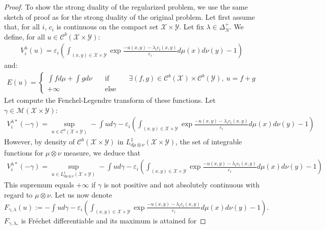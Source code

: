 \begin{proof}
To show the strong duality of the regularized problem, we use the same sketch of proof as for the strong duality of the original problem. 
\medskip
Let first assume that, for all $i$, $c_i$ is continuous on the compact set $\mathcal{X}\times\mathcal{Y}$. Let fix $\lambda\in\Delta^+_N$. We define, for all $u\in\mathcal{C}^b(\mathcal{X}\times\mathcal{Y})$:
\begin{align*}
    V^\lambda_i(u) = \varepsilon_i\left(\int_{(x,y)\in\mathcal{X}\times\mathcal{Y}} \exp{\frac{-u(x,y)-\lambda_ic_i(x,y)}{\varepsilon_i}}d\mu(x)d\nu(y)-1\right)
\end{align*}
and:
\begin{align*}
E(u)=\left\{\begin{matrix} \int fd\mu+\int gd\nu &\quad\text{if}\quad& \exists (f,g)\in \mathcal{C}^b(\mathcal{X})\times\mathcal{C}^b(\mathcal{Y}),~ u = f+g\\
+\infty &\quad\text{else}\quad&\end{matrix}\right.
\end{align*}
Let compute the Fenchel-Legendre transform of these functions. Let $\gamma\in\mathcal{M}(\mathcal{X}\times\mathcal{Y})$:
\begin{align*}
    V^{\lambda*}_i(-\gamma) = \sup_{u\in\mathcal{C}^b(\mathcal{X}\times\mathcal{Y})}-\int ud\gamma -\varepsilon_i\left(\int_{(x,y)\in\mathcal{X}\times\mathcal{Y}} \exp{\frac{-u(x,y)-\lambda_ic_i(x,y)}{\varepsilon_i}}d\mu(x)d\nu(y)-1\right) 
\end{align*}
However, by density of $\mathcal{C}^b(\mathcal{X}\times\mathcal{Y})$ in $L^1_{d\mu\otimes\nu}(\mathcal{X}\times\mathcal{Y})$, the set of integrable functions for $\mu\otimes\nu$ measure, we deduce that
\begin{align*}
    V^{\lambda*}_i(-\gamma) = \sup_{u\in L^1_{d\mu\otimes\nu}(\mathcal{X}\times\mathcal{Y})}-\int ud\gamma -\varepsilon_i\left(\int_{(x,y)\in\mathcal{X}\times\mathcal{Y}} \exp{\frac{-u(x,y)-\lambda_ic_i(x,y)}{\varepsilon_i}}d\mu(x)d\nu(y)-1\right) 
\end{align*}
This supremum equals $+\infty$ if $\gamma$ is not positive and not absolutely continuous with regard to $\mu\otimes \nu$. Let us now denote 
$F_{\gamma,\lambda}(u):=-\int ud\gamma -\varepsilon_i\left(\int_{(x,y)\in\mathcal{X}\times\mathcal{Y}} \exp{\frac{-u(x,y)-\lambda_ic_i(x,y)}{\varepsilon_i}}d\mu(x)d\nu(y)-1\right).$
$F_{\gamma,\lambda_*}$ is Fréchet differentiable and its maximum is attained for 

\end{proof}
